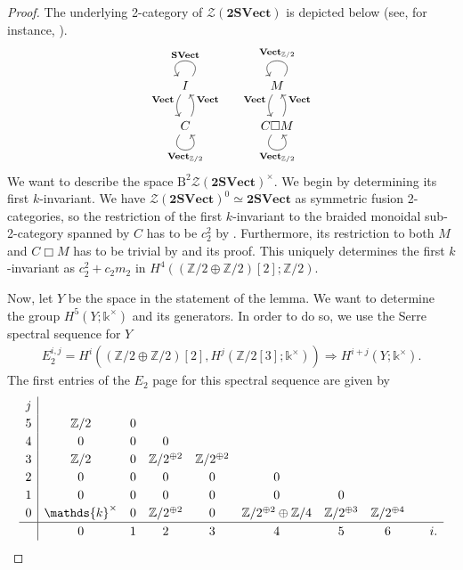 \documentclass[pdftex]{sigma}
\numberwithin{equation}{section}
\begin{document}
\begin{proof}
The underlying 2-category of $\mathscr{Z}(\mathbf{2SVect})$ is depicted below (see, for instance, \cite{JFR}). $$\begin{tikzcd}
I \arrow[d, "\mathbf{Vect}"', bend right] \arrow["\mathbf{SVect}"', loop, distance=2em, in=125, out=55] & & M \arrow[d, "\mathbf{Vect}"', bend right] \arrow["\mathbf{Vect}_{\mathbb{Z}/2}"', loop, distance=2em, in=125, out=55] \\
C \arrow[u, "\mathbf{Vect}"', bend right] \arrow["\mathbf{Vect}_{\mathbb{Z}/2}"', loop, distance=2em, in=305, out=235] & & C\Box M \arrow[u, "\mathbf{Vect}"', bend right] \arrow["\mathbf{Vect}_{\mathbb{Z}/2}"', loop, distance=2em, in=305, out=235]
\end{tikzcd}$$ We want to describe the space $\mathrm{B}^2\mathscr{Z}(\mathbf{2SVect})^{\times}$. We begin by determining its first $k$-invariant. We have $\mathscr{Z}(\mathbf{2SVect})^0\simeq \mathbf{2SVect}$ as symmetric fusion 2-categories, so the restriction of the first $k$-invariant to the braided monoidal sub-2-category spanned by $C$ has to be $c_2^2$ by \cite{GJF0}. Furthermore, its restriction to both $M$ and $C\Box M$ has to be trivial by \cite[Theorem~3.2]{JFR} and its proof. This uniquely determines the first $k$-invariant as $c_2^2+c_2m_2$ in $H^4((\mathbb{Z}/2\oplus \mathbb{Z}/2)[2];\mathbb{Z}/2)$.

Now, let $Y$ be the space in the statement of the lemma. We want to determine the group $H^5(Y;\mathds{k}^{\times})$ and its generators. In order to do so, we use the Serre spectral sequence for $Y$
\begin{gather*}
E_2^{i,j}=H^i((\mathbb{Z}/2\oplus\mathbb{Z}/2)[2], H^j(\mathbb{Z}/2[3];\mathds{k}^{\times}))\Rightarrow H^{i+j}(Y;\mathds{k}^{\times}).
\end{gather*}
 The first entries of the $E_2$ page for this spectral sequence are given by
\begin{equation}\renewcommand{\arraystretch}{1.2}\label{eq:E2braided}
 \begin{array}{c|cccccccc}
 j \\
 5 & \mathbb{Z}/2 & 0 \\
 4 & 0 & 0 & 0 \\
 3 & \mathbb{Z}/2 & 0 & \mathbb{Z}/2^{\oplus 2} & \mathbb{Z}/2^{\oplus 2}\\
 2 & 0 & 0 & 0 & 0 & 0 \\
 1 & 0 & 0 & 0 & 0 & 0 & 0 \\
 0 & \mathds{k}^{\times}& 0 & \mathbb{Z}/2^{\oplus 2} & 0 & \mathbb{Z}/2^{\oplus 2}\oplus\mathbb{Z}/4& \mathbb{Z}/2^{\oplus 3} &\mathbb{Z}/2^{\oplus 4}\\
 \hline
 & 0 & 1 & 2 & 3 & 4 & 5 & 6 & \quad i.
\end{array}
\end{equation}


\end{proof}
\end{document}
